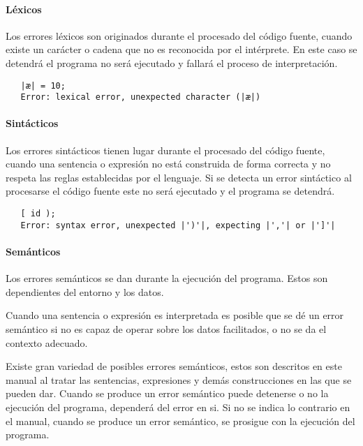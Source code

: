 \paragraph {Léxicos} 
Los errores léxicos son originados durante el procesado del código fuente, cuando existe un carácter o cadena que no es reconocida por el intérprete. En este caso 
se detendrá el programa no será ejecutado y fallará el proceso de interpretación. \\

\begin{lstlisting}
   |æ| = 10;
   Error: lexical error, unexpected character (|æ|)
\end{lstlisting}

\paragraph {Sintácticos}
Los errores sintácticos tienen lugar durante el procesado del código fuente, cuando una sentencia o expresión no está construida de forma correcta y no respeta las reglas establecidas por el 
lenguaje. Si se detecta un error sintáctico al procesarse el código fuente este no será ejecutado y el programa se detendrá. \\

\begin{lstlisting}
   [ id );
   Error: syntax error, unexpected |')'|, expecting |','| or |']'|
\end{lstlisting}

\paragraph {Semánticos} 
Los errores semánticos se dan durante la ejecución del programa. Estos son dependientes del entorno y los datos. 

Cuando una sentencia o expresión es interpretada es posible que se dé un error semántico si no es capaz de operar sobre los datos
facilitados, o no se da el contexto adecuado. 

Existe gran variedad de posibles errores semánticos, estos son descritos en este manual al tratar las sentencias, expresiones y demás construcciones en las que se 
pueden dar. Cuando se produce un error semántico puede detenerse o no la ejecución del programa, dependerá del error en si. Si no se indica lo contrario en
el manual, cuando se produce un error semántico, se prosigue con la ejecución del programa. \\

